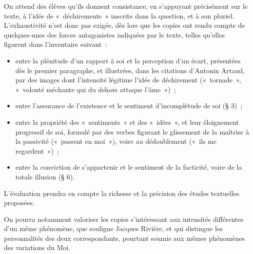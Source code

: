 {On attend des élèves qu'ils donnent consistance, en s'appuyant précisément sur
le texte, à l'idée de «~déchirements~» inscrite dans la question, et à son pluriel.
L'exhaustivité n'est donc pas exigée, dès lors que les copies ont rendu compte de
quelques-unes des forces antagonistes indiquées par le texte, telles qu'elles figurent
dans l'inventaire suivant~:

\begin{itemize}
\item entre la plénitude d'un rapport à soi et la perception d'un écart, présentées dès
le premier paragraphe, et illustrées, dans les citations d'Antonin Artaud, par des
images dont l'intensité légitime l'idée de déchirement («~tornade~», «~volonté
méchante qui du dehors attaque l'âme~»)~;
\item entre l'assurance de l'existence et le sentiment d'incomplétude de soi (§ 3)~;
\item entre la propriété des «~sentiments~» et des «~idées~», et leur éloignement progressif
de soi, formulé par des verbes figurant le glissement de la maîtrise à la passivité
(«~passent en moi~»), voire au dédoublement («~ils me regardent~»)~;
\item entre la conviction de s'appartenir et le sentiment de la facticité, voire de la totale
illusion (§ 6).
\end{itemize}

L'évaluation prendra en compte la richesse et la précision des études textuelles
proposées.

On pourra notamment valoriser les copies s'intéressant aux intensités différentes d'un
même phénomène, que souligne Jacques Rivière, et qui distingue les personnalités des
deux correspondants, pourtant soumis aux mêmes phénomènes des variations du Moi.}%
